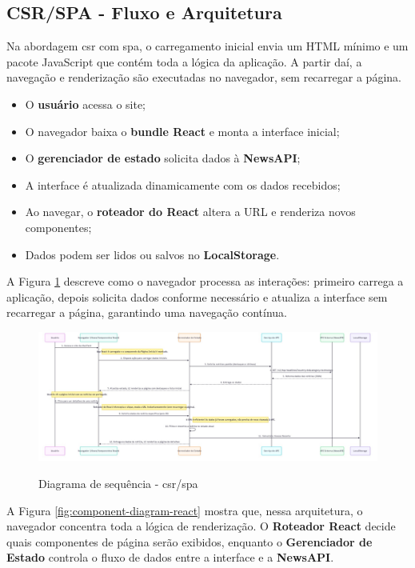 \subsection{CSR/SPA - Fluxo e Arquitetura}
\label{subsec:csr-spa}

Na abordagem \acrfull{csr} com \acrfull{spa}, o carregamento inicial envia um HTML mínimo e um pacote JavaScript que contém toda a lógica da aplicação. A partir daí, a navegação e renderização são executadas no navegador, sem recarregar a página.

\begin{itemize}
  \item O \textbf{usuário} acessa o site;
  \item O navegador baixa o \textbf{bundle React} e monta a interface inicial;
  \item O \textbf{gerenciador de estado} solicita dados à \textbf{NewsAPI};
  \item A interface é atualizada dinamicamente com os dados recebidos;
  \item Ao navegar, o \textbf{roteador do React} altera a URL e renderiza novos componentes;
  \item Dados podem ser lidos ou salvos no \textbf{LocalStorage}.
\end{itemize}

A Figura \ref{fig:sequence-diagram-csr} descreve como o navegador processa as interações: primeiro carrega a aplicação, depois solicita dados conforme necessário e atualiza a interface sem recarregar a página, garantindo uma navegação contínua.

\begin{figure}[H]
  \centering
  \caption{Diagrama de sequência - \acrshort{csr}/\acrshort{spa}}
  \includegraphics[width=1\textwidth]{media/wall_tech_detail_sequence_diagram.jpeg}
  \label{fig:sequence-diagram-csr}
\end{figure}


A Figura \ref{fig:component-diagram-react} mostra que, nessa arquitetura, o navegador concentra toda a lógica de renderização. O \textbf{Roteador React} decide quais componentes de página serão exibidos, enquanto o \textbf{Gerenciador de Estado} controla o fluxo de dados entre a interface e a \textbf{NewsAPI}.

